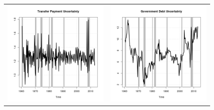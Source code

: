 \documentclass[11pt]{article}
\begin{document}
\begin{figure}
\begin{center}
\begin{tabular}{cc}
\includegraphics[scale=0.45]{./results/pics0.04/fpucoin_transfers.png} & \includegraphics[scale=0.45]{./results/pics0.04/fpucoin_debt.png}  
\end{tabular}
\end{center}
\end{figure} 

\ \\ \ \\

\newpage

\nocite{*}
\begin{spacing}{1.15}


\end{spacing}
\end{document}
